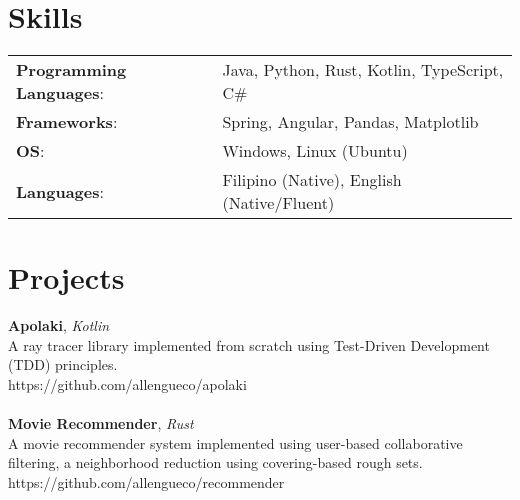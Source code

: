 \documentclass[line,margin]{res}
\begin{document}
\begin{resume}
	\section{Skills}
	\begin{tabular}{@{}ll}
		\textbf{Programming Languages}: & Java, Python, Rust, Kotlin, TypeScript, C\#             \\
		\textbf{Frameworks}:            & Spring, Angular, Pandas, Matplotlib                     \\
		\textbf{OS}:                    & Windows, Linux (Ubuntu)                                 \\
		\textbf{Languages}:             & Filipino (Native), English (Native/Fluent)              \\
	\end{tabular}
	\section{Projects}
	\textbf{Apolaki}, {\sl Kotlin}\\ A ray tracer library implemented from scratch using Test-Driven Development (TDD) principles.\\ https://github.com/allengueco/apolaki\\\\
	\textbf{Movie Recommender}, {\sl Rust}\\ A movie recommender system implemented using user-based collaborative filtering, a neighborhood reduction using covering-based rough sets.\\ https://github.com/allengueco/recommender\\\\
\end{resume}
\end{document}
